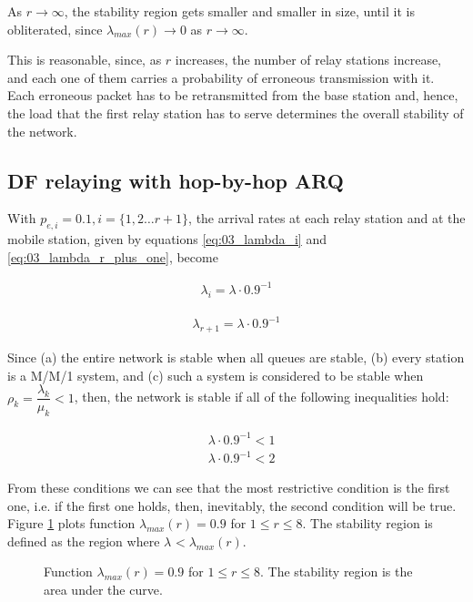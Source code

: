 As $r \to \infty$, the stability region gets smaller and smaller in size, until
it is obliterated, since $\lambda_{max}(r) \to 0$ as $r \to \infty$.

This is reasonable, since, as $r$ increases, the number of relay stations
increase, and each one of them carries a probability of erroneous transmission
with it. Each erroneous packet has to be retransmitted from the base station
and, hence, the load that the first relay station has to serve determines the
overall stability of the network.


\subsection{DF relaying with hop-by-hop ARQ}

With $p_{e,i} = 0.1, i = \{1,2 \dots r+1\}$, the arrival rates at each relay
station and at the mobile station, given by equations \ref{eq:03_lambda_i}
and \ref{eq:03_lambda_r_plus_one}, become

\begin{align}
  \lambda_i = \lambda \cdot 0.9^{-1}
  \label{eq:04_stability_region_df_hbh_lambda_i}
\end{align}

\begin{align}
  \lambda_{r+1} = \lambda \cdot 0.9^{-1}
  \label{eq:04_stability_region_df_hbh_lambda_r_plus_one}
\end{align}

Since (a) the entire network is stable when all queues are stable, (b) every
station is a M/M/1 system, and (c) such a system is considered to be stable
when $\rho_k = \dfrac{\lambda_k}{\mu_k} < 1$, then, the network is stable if all
of the following inequalities hold:

\begin{align*}
  &\lambda \cdot 0.9^{-1} < 1 \\
  &\lambda \cdot 0.9^{-1} < 2
\end{align*}

From these conditions  we can see that the most restrictive condition is the
first one, i.e. if the first one holds, then, inevitably, the second condition
will be true. Figure \ref{fig:04_stability_region_df_hbh} plots function
$\lambda_{max}(r) = 0.9$ for $1 \leq r \leq 8$. The stability
region is defined as the region where $\lambda_{} < \lambda_{max}(r)$.

\begin{figure}\centering
  
  \caption{Function $\lambda_{max}(r) = 0.9$ for $1 \leq r \leq 8$.
    The stability region is the area under the curve.}
  \label{fig:04_stability_region_df_hbh}
\end{figure}

